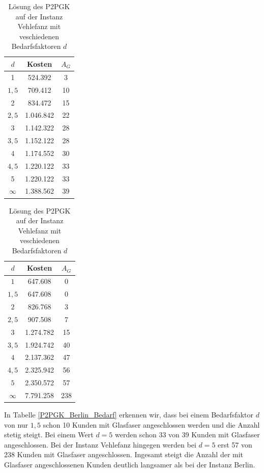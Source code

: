 \documentclass[11pt,a4paper]{article}
\theoremstyle{my_th_style1}
\begin{document}
\begin{table}[h]
	\centering
	\begin{minipage}{.35\textwidth}
			\centering
	\begin{tabular}{c|c|c}
		\centering
		\(d\) & Kosten & $A_G$ \\	
		\hline
		1& 524.392 & 3 \\
		\(1,5\) & 709.412 & 10 \\
		2 & 834.472 & 15 \\
		\(2,5\) & 1.046.842 & 22 \\
		3 & 1.142.322 & 28 \\
		\(3,5\) & 1.152.122 & 28 \\
		4 & 1.174.552 & 30 \\
		\(4,5\) & 1.220.122 & 33 \\	
		5 & 1.220.122 & 33 \\
		$\infty$ &  1.388.562 & 39 \\
	\end{tabular}
	\caption{Lösung des P2PGK auf der Instanz Berlin mit veschiedenen Bedarfsfaktoren \(d\)}
	\label{P2PGK_Berlin_Bedarf}
	\end{minipage}
	\hspace{0.5cm}
	\begin{minipage}{0.35\textwidth}
			\centering
		\begin{tabular}{c|c|c}
			\centering
			$d$ & Kosten & $A_G$ \\	
			\hline
			$1$   &   647.608 & 0  \\
			$1,5$ &   647.608 & 0  \\
			$2$   &   826.768 & 3  \\
			$2,5$ &   907.508 & 7  \\
			$3$   & 1.274.782 & 15 \\
			$3,5$ & 1.924.742 & 40 \\
			$4$   & 2.137.362 & 47 \\
			$4,5$ & 2.325.942 & 56 \\
			$5$   & 2.350.572 & 57 \\
			$\infty$ & 7.791.258 & 238 \\ 
		\end{tabular}
	\caption{Lösung des P2PGK auf der Instanz Vehlefanz mit veschiedenen Bedarfsfaktoren $d$}
	\label{P2PGK_Vehlefanz_Bedarf}
	\end{minipage}
\end{table}
\vspace{0.5cm}
In Tabelle \ref{P2PGK_Berlin_Bedarf} erkennen wir, dass  bei einem Bedarfsfaktor $d$ von nur $1,5$ schon 10 Kunden mit Glasfaser angeschlossen werden und die Anzahl stetig steigt.
Bei einem Wert $d=5$ werden schon 33 von 39 Kunden mit Glasfaser angeschlossen.
Bei der Instanz Vehlefanz hingegen werden bei $d=5$ erst 57 von 238 Kunden mit Glasfaser angeschlossen.
Ingesamt steigt die Anzahl der mit Glasfaser angeschlossenen Kunden deutlich langsamer als bei der Instanz Berlin.
\end{document}
